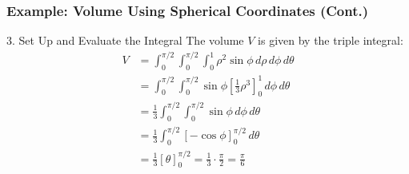\documentclass[aspectratio=169, UTF8]{beamer}
\begin{document}
\begin{frame}
    \frametitle{Example: Volume Using Spherical Coordinates (Cont.)}

    \begin{block}{3. Set Up and Evaluate the Integral}
        The volume $V$ is given by the triple integral:
        \begin{align*}
            V & = \int_{0}^{\pi/2} \int_{0}^{\pi/2} \int_{0}^{1} \rho^2 \sin\phi \, d\rho \, d\phi \, d\theta             \\
              & = \int_{0}^{\pi/2} \int_{0}^{\pi/2} \sin\phi \left[ \frac{1}{3}\rho^3 \right]_{0}^{1} \, d\phi \, d\theta \\
              & = \frac{1}{3} \int_{0}^{\pi/2} \int_{0}^{\pi/2} \sin\phi \, d\phi \, d\theta                              \\
              & = \frac{1}{3} \int_{0}^{\pi/2} [-\cos\phi]_{0}^{\pi/2} \, d\theta                                         \\
              & = \frac{1}{3} [\theta]_{0}^{\pi/2} = \frac{1}{3} \cdot \frac{\pi}{2} = \frac{\pi}{6}
        \end{align*}
    \end{block}

\end{frame}

\end{document}
